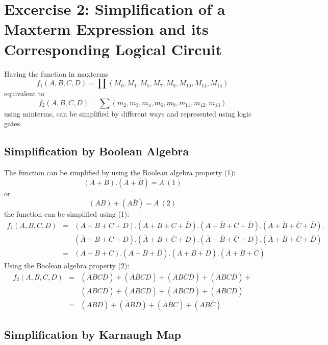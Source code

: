 \section{\color{olive}Excercise 2: Simplification of a Maxterm Expression and its Corresponding Logical Circuit}

Having the function in maxterms $$f_1 (A,B,C,D) = \prod\left(M_0, M_1 , M_5 , M_7 , M_8 , M_{10} , M_{14} , M_{15} \right)$$ equivalent to $$f_2 (A,B,C,D) = \sum\left(m_2, m_3 , m_4 , m_6 , m_9 , m_{11} , m_{12} , m_{13} \right)$$ using minterms, can be simplified by different ways and represented using logic gates.

    \subsection{\color{purple}Simplification by Boolean Algebra}

    The function can be simplified by using the Boolean algebra property (1): $$(A+B).(A+\overline{B})=A~(1)$$ or $$(AB)+(A\overline{B})=A~(2)$$ the function can be simplified using (1):
    \begin{eqnarray*}
        f_1 (A,B,C,D) &= &(A+B+C+D).(A+B+C+\overline{D}).(A+\overline{B}+C+\overline{D}).(A+\overline{B}+\overline{C}+\overline{D}).\\
        &&(\overline{A}+B+C+D).(\overline{A}+B+\overline{C}+D).(\overline{A}+\overline{B}+\overline{C}+D).(\overline{A}+\overline{B}+\overline{C}+\overline{D}) \\
        &=&(A+B+C).(A+\overline{B}+\overline{D}).(\overline{A}+B+D).(\overline{A}+\overline{B}+\overline{C})
    \end{eqnarray*}
    Using the Boolean algebra property (2):
    \begin{eqnarray*}
        f_2(A,B,C,D) &= &(\overline{A}\overline{B}C\overline{D})+(\overline{A}\overline{B}CD)+(\overline{A}B\overline{C}\overline{D})+(\overline{A}BC\overline{D})+\\
        &&(A\overline{B}\overline{C}D)+(A\overline{B}CD)+(AB\overline{C}\overline{D})+(AB\overline{C}D)\\
        &=&(A\overline{B}D)+(\overline{A}B\overline{D})+(\overline{A}\overline{B}C)+(AB\overline{C})
    \end{eqnarray*}

    \subsection{\color{purple}Simplification by Karnaugh Map}


